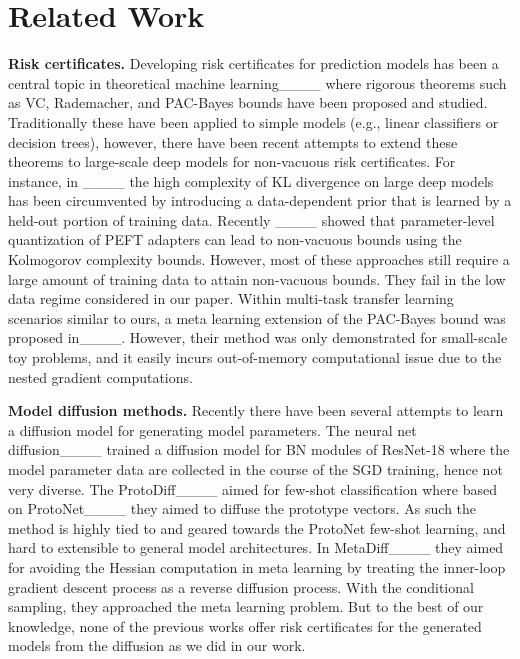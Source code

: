 \section{Related Work}
\label{sec:related}

\textbf{Risk certificates.}
Developing risk certificates for prediction models has been a central topic in theoretical machine learning____ where rigorous theorems such as VC, Rademacher, and PAC-Bayes bounds have been proposed and studied. Traditionally these have been applied to simple models (e.g., linear classifiers or decision trees), however, there have been recent attempts to extend these theorems to large-scale deep models for non-vacuous risk certificates. For instance, in ____ the high complexity of KL divergence on large deep models has been circumvented by introducing a data-dependent prior that is learned by a held-out portion of training data. Recently ____ showed that parameter-level quantization of PEFT adapters can lead to non-vacuous bounds using the Kolmogorov complexity bounds. However, most of these approaches still require a large amount of training data to attain non-vacuous bounds. They fail in the low data regime considered in our paper. 
Within multi-task transfer learning scenarios similar to ours, a meta learning extension of the PAC-Bayes bound was proposed in____.
However, their method was only demonstrated for small-scale toy problems, and it easily incurs out-of-memory computational issue due to the nested gradient computations.

\textbf{Model diffusion methods.}
Recently there have been several attempts to learn a diffusion model for generating model parameters. The neural net diffusion____ trained a diffusion model for BN modules of ResNet-18 where the model parameter data are collected in the course of the SGD training, hence not very diverse. 
The ProtoDiff____ aimed for few-shot classification where based on ProtoNet____ they aimed to diffuse the prototype vectors. As such the method is highly tied to and geared towards the ProtoNet few-shot learning, and hard to extensible to general model architectures. 
In MetaDiff____ they aimed for avoiding the Hessian computation in meta learning by treating the  inner-loop gradient descent process as a reverse diffusion process. With the conditional sampling, they approached the meta learning problem. 
But to the best of our knowledge, none of the previous works offer risk certificates for the generated models from the diffusion as we did in our work. 


